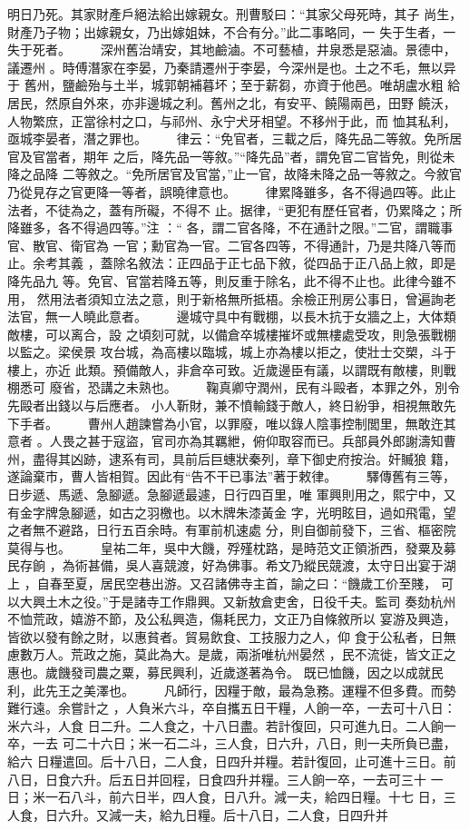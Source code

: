 \documentclass{ctexart}
\begin{document}
明日乃死。其家財產戶絕法給出嫁親女。刑曹駁曰：``其家父母死時，其子 尚生，財產乃子物；出嫁親女，乃出嫁姐妹，不合有分。''此二事略同，一 失于生者，一失于死者。 　　深州舊治靖安，其地鹼滷。不可藝植，井泉悉是惡滷。景德中，議遷州 。時傅潛家在李晏，乃秦請遷州于李晏，今深州是也。土之不毛，無以异于 舊州，鹽鹼殆与土半，城郭朝補暮坏；至于薪芻，亦資于他邑。唯胡盧水粗 給居民，然原自外來，亦非邊城之利。舊州之北，有安平、饒陽兩邑，田野 饒沃，人物繁庶，正當徐村之口，与祁州、永宁犬牙相望。不移州于此，而 恤其私利，亟城李晏者，潛之罪也。 　　律云：``免官者，三載之后，降先品二等敘。免所居官及官當者，期年 之后，降先品一等敘。''``降先品''者，謂免官二官皆免，則從未降之品降 二等敘之。``免所居官及官當，''止一官，故降未降之品一等敘之。今敘官 乃從見存之官更降一等者，誤曉律意也。 　　律累降雖多，各不得過四等。此止法者，不徒為之，蓋有所礙，不得不 止。据律，``更犯有歷任官者，仍累降之；所降雖多，各不得過四等。''注 ：`` 各，謂二官各降，不在通計之限。''二官，謂職事官、散官、衛官為 一官；勳官為一官。二官各四等，不得通計，乃是共降八等而止。余考其義 ，蓋除名敘法：正四品于正七品下敘，從四品于正八品上敘，即是降先品九 等。免官、官當若降五等，則反重于除名，此不得不止也。此律今雖不用， 然用法者須知立法之意，則于新格無所抵梧。余檢正刑房公事日，曾遍詢老 法官，無一人曉此意者。 　　邊城守具中有戰棚，以長木抗于女牆之上，大体類敵樓，可以离合，設 之頃刻可就，以備倉卒城樓摧坏或無樓處受攻，則急張戰棚以監之。梁侯景 攻台城，為高樓以臨城，城上亦為樓以拒之，使壯士交槊，斗于樓上，亦近 此類。預備敵人，非倉卒可致。近歲邊臣有議，以謂既有敵樓，則戰棚悉可 廢省，恐講之未熟也。 　　鞠真卿守潤州，民有斗毆者，本罪之外，別令先毆者出錢以与后應者。 小人靳財，兼不憤輸錢于敵人，終日紛爭，相視無敢先下手者。 　　曹州人趙諫嘗為小官，以罪廢，唯以錄人陰事控制閭里，無敢迕其意者 。人畏之甚于寇盜，官司亦為其羈紲，俯仰取容而已。兵部員外郎謝濤知曹 州，盡得其凶跡，逮系有司，具前后巨蟪狀秦列，章下御史府按治。奸贓狼 籍，遂論棄市，曹人皆相賀。因此有``告不干已事法''著于敕律。 　　驛傳舊有三等，日步遞、馬遞、急腳遞。急腳遞最遽，日行四百里，唯 軍興則用之，熙宁中，又有金字牌急腳遞，如古之羽檄也。以木牌朱漆黃金 字，光明眩目，過如飛電，望之者無不避路，日行五百余時。有軍前机速處 分，則自御前發下，三省、樞密院莫得与也。 　　皇祐二年，吳中大饑，殍殣枕路，是時范文正領浙西，發粟及募民存餉 ，為術甚備，吳人喜競渡，好為佛事。希文乃縱民競渡，太守日出宴于湖上 ，自春至夏，居民空巷出游。又召諸佛寺主首，諭之曰：``饑歲工价至賤， 可以大興土木之役。''于是諸寺工作鼎興。又新敖倉吏舍，日役千夫。監司 奏劾杭州不恤荒政，嬉游不節，及公私興造，傷耗民力，文正乃自條敘所以 宴游及興造，皆欲以發有餘之財，以惠貧者。貿易飲食、工技服力之人，仰 食于公私者，日無慮數万人。荒政之施，莫此為大。是歲，兩浙唯杭州晏然 ，民不流徙，皆文正之惠也。歲饑發司農之粟，募民興利，近歲遂著為令。 既已恤饑，因之以成就民利，此先王之美澤也。 　　凡師行，因糧于敵，最為急務。運糧不但多費。而勢難行遠。余嘗計之 ，人負米六斗，卒自攜五日干糧，人餉一卒，一去可十八日：米六斗，人食 日二升。二人食之，十八日盡。若計復回，只可進九日。二人餉一卒，一去 可二十六日；米一石二斗，三人食，日六升，八日，則一夫所負已盡，給六 日糧遣回。后十八日，二人食，日四升并糧。若計復回，止可進十三日。前 八日，日食六升。后五日并回程，日食四升并糧。三人餉一卒，一去可三十 一日；米一石八斗，前六日半，四人食，日八升。減一夫，給四日糧。十七 日，三人食，日六升。又減一夫，給九日糧。后十八日，二人食，日四升并 
\end{document}
